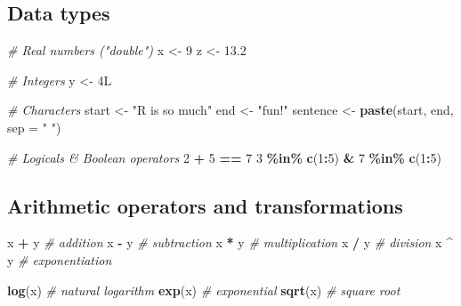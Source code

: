 \documentclass[
  11pt,
]{article}
\newenvironment{Shaded}{\begin{snugshade}}{\end{snugshade}}
\newcommand{\AttributeTok}[1]{\textcolor[rgb]{0.13,0.29,0.53}{#1}}
\newcommand{\CommentTok}[1]{\textcolor[rgb]{0.56,0.35,0.01}{\textit{#1}}}
\newcommand{\DecValTok}[1]{\textcolor[rgb]{0.00,0.00,0.81}{#1}}
\newcommand{\FloatTok}[1]{\textcolor[rgb]{0.00,0.00,0.81}{#1}}
\newcommand{\FunctionTok}[1]{\textcolor[rgb]{0.13,0.29,0.53}{\textbf{#1}}}
\newcommand{\NormalTok}[1]{#1}
\newcommand{\OtherTok}[1]{\textcolor[rgb]{0.56,0.35,0.01}{#1}}
\newcommand{\SpecialCharTok}[1]{\textcolor[rgb]{0.81,0.36,0.00}{\textbf{#1}}}
\newcommand{\StringTok}[1]{\textcolor[rgb]{0.31,0.60,0.02}{#1}}
\begin{document}
\hypertarget{data-types}{%
\subsection{Data types}\label{data-types}}

\begin{Shaded}
\begin{Highlighting}[]
\CommentTok{\# Real numbers ("double")}
\NormalTok{x }\OtherTok{\textless{}{-}} \DecValTok{9}
\NormalTok{z }\OtherTok{\textless{}{-}} \FloatTok{13.2}

\CommentTok{\# Integers}
\NormalTok{y }\OtherTok{\textless{}{-}}\NormalTok{ 4L}

\CommentTok{\# Characters}
\NormalTok{start }\OtherTok{\textless{}{-}} \StringTok{"R is so much"}
\NormalTok{end }\OtherTok{\textless{}{-}} \StringTok{"fun!"}
\NormalTok{sentence }\OtherTok{\textless{}{-}} \FunctionTok{paste}\NormalTok{(start, end, }\AttributeTok{sep =} \StringTok{" "}\NormalTok{)}

\CommentTok{\# Logicals \& Boolean operators}
\DecValTok{2} \SpecialCharTok{+} \DecValTok{5} \SpecialCharTok{==} \DecValTok{7}
\DecValTok{3} \SpecialCharTok{\%in\%} \FunctionTok{c}\NormalTok{(}\DecValTok{1}\SpecialCharTok{:}\DecValTok{5}\NormalTok{) }\SpecialCharTok{\&} \DecValTok{7} \SpecialCharTok{\%in\%} \FunctionTok{c}\NormalTok{(}\DecValTok{1}\SpecialCharTok{:}\DecValTok{5}\NormalTok{)}
\end{Highlighting}
\end{Shaded}

\hypertarget{arithmetic-operators-and-transformations}{%
\subsection{Arithmetic operators and transformations}\label{arithmetic-operators-and-transformations}}

\begin{Shaded}
\begin{Highlighting}[]
\NormalTok{x }\SpecialCharTok{+}\NormalTok{ y     }\CommentTok{\# addition}
\NormalTok{x }\SpecialCharTok{{-}}\NormalTok{ y     }\CommentTok{\# subtraction}
\NormalTok{x }\SpecialCharTok{*}\NormalTok{ y     }\CommentTok{\# multiplication}
\NormalTok{x }\SpecialCharTok{/}\NormalTok{ y     }\CommentTok{\# division}
\NormalTok{x }\SpecialCharTok{\^{}}\NormalTok{ y     }\CommentTok{\# exponentiation}

\FunctionTok{log}\NormalTok{(x)    }\CommentTok{\# natural logarithm}
\FunctionTok{exp}\NormalTok{(x)    }\CommentTok{\# exponential}
\FunctionTok{sqrt}\NormalTok{(x)   }\CommentTok{\# square root}
\end{Highlighting}
\end{Shaded}
\end{document}
